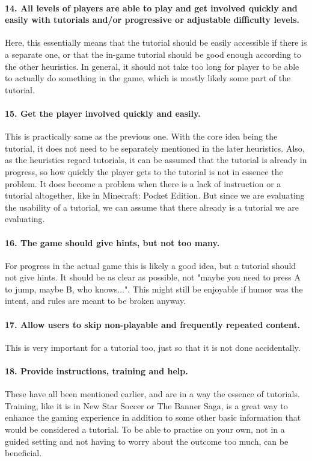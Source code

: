 \paragraph{14. All levels of players are able to play and get involved quickly and easily with tutorials and/or progressive or adjustable difficulty levels. }
Here, this essentially means that the tutorial should be easily accessible if there is a separate one, or that the in-game tutorial should be good enough according to the other heuristics. In general, it should not take too long for player to be able to actually do something in the game, which is mostly likely some part of the tutorial.
 
\paragraph{15. Get the player involved quickly and easily.}
This is practically same as the previous one. With the core idea being the tutorial, it does not need to be separately mentioned in the later heuristics. Also, as the heuristics regard tutorials, it can be assumed that the tutorial is already in progress, so how quickly the player gets to the tutorial is not in essence the problem. It does become a problem when there is a lack of instruction or a tutorial altogether, like in Minecraft: Pocket Edition. But since we are evaluating the usability of a tutorial, we can assume that there already is a tutorial we are evaluating.

\paragraph{16. The game should give hints,  but not too many.} For progress in the actual game this is likely a good idea, but a tutorial should not give hints. It should be as clear as possible, not "maybe you need to press A to jump, maybe B, who knows...". This might still be enjoyable if humor was the intent, and rules are meant to be broken anyway.

\paragraph{17. Allow users to skip non-playable and frequently repeated content.} This is very important for a tutorial too, just so that it is not done accidentally.

\paragraph{18. Provide instructions, training and help.} These have all been mentioned earlier, and are in a way the essence of tutorials. Training, like it is in New Star Soccer or The Banner Saga, is a great way to enhance the gaming experience in addition to some other basic information that would be considered a tutorial. To be able to practise on your own, not in a guided setting and not having to worry about the outcome too much, can be beneficial.

